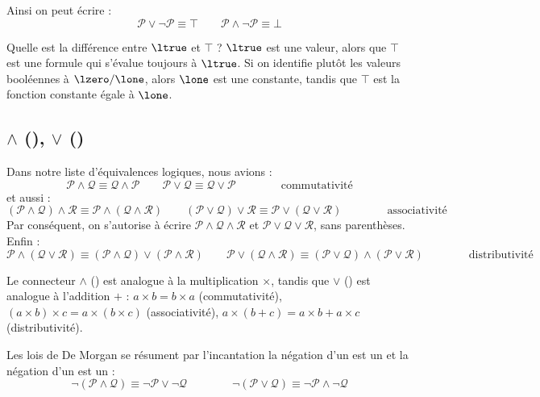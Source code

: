 \documentclass[11pt,class=report,crop=false]{standalone}
\begin{document}
Ainsi on peut écrire :
\[ \mathcal{P} \lor \lnot \mathcal{P} \equiv \top \qquad \mathcal{P} \land \lnot \mathcal{P} \equiv \bot\]


Quelle est la différence entre $\ltrue$ et $\top$ ?
$\ltrue$ est une valeur, alors que $\top$ est une formule qui s'évalue toujours à $\ltrue$.
Si on identifie plutôt les valeurs booléennes à $\lzero/\lone$, alors $\lone$ est une constante, tandis que $\top$ est la fonction constante égale à $\lone$.

\subsection{$\land$ (\tand), $\lor$ (\tor)}

Dans notre liste d'équivalences logiques, nous avions :
\[ \mathcal{P} \land \mathcal{Q} \equiv \mathcal{Q} \land \mathcal{P}\qquad \mathcal{P} \lor \mathcal{Q} \equiv \mathcal{Q} \lor \mathcal{P} \qquad\qquad \text{commutativité} \]
et aussi :
\[ (\mathcal{P} \land \mathcal{Q}) \land \mathcal{R} \equiv \mathcal{P} \land (\mathcal{Q} \land \mathcal{R}) 
\qquad 
(\mathcal{P} \lor \mathcal{Q}) \lor \mathcal{R} \equiv \mathcal{P} \lor (\mathcal{Q} \lor \mathcal{R}) 
\qquad\qquad \text{associativité} \]
Par conséquent, on s'autorise à écrire $\mathcal{P} \land \mathcal{Q} \land \mathcal{R}$ et $\mathcal{P} \lor \mathcal{Q} \lor \mathcal{R}$, sans parenthèses.
Enfin :
\[ \mathcal{P} \land (\mathcal{Q} \lor \mathcal{R}) \equiv (\mathcal{P} \land \mathcal{Q}) \lor (\mathcal{P} \land \mathcal{R}) \qquad \mathcal{P} \lor (\mathcal{Q} \land \mathcal{R}) \equiv (\mathcal{P} \lor \mathcal{Q}) \land (\mathcal{P} \lor \mathcal{R}) \qquad\qquad \text{distributivité} \]

\medskip

Le connecteur $\land$ (\tand) est analogue à la multiplication $\times$, tandis que $\lor$ (\tor) est analogue à l'addition $+$ :
$a \times b = b \times a$ (commutativité), $(a \times b) \times c = a \times (b \times c)$ (associativité), $a \times (b+c) = a \times b + a \times c$ (distributivité).

Les lois de De Morgan se résument par l'incantation \og{}la négation d'un \tand{} est un \tor\fg{} et \og{}la négation d'un \tor{} est un \tand\fg{} :
\[ \lnot(\mathcal{P} \land \mathcal{Q}) \equiv \lnot\mathcal{P} \lor \lnot\mathcal{Q}
\qquad\qquad \lnot(\mathcal{P} \lor \mathcal{Q}) \equiv \lnot\mathcal{P} \land \lnot\mathcal{Q}
 \]
\end{document}
